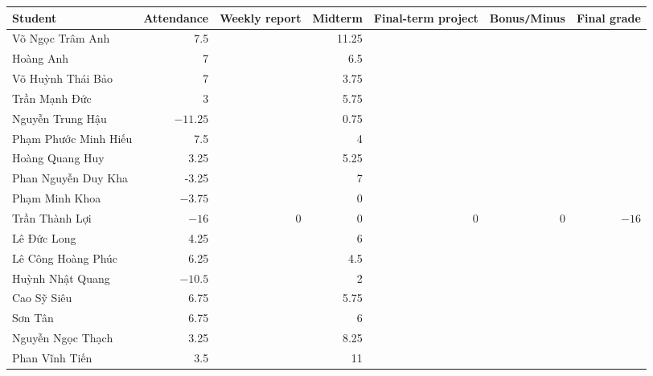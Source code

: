\documentclass{article}
\begin{document}
\begin{table}[H]
    \centering
    \begin{tabular}{|l|r|r|r|r|r|r|}
        \hline
        Student & Attendance & Weekly report & Midterm & Final-term project & Bonus{\tt/}Minus & Final grade \\
        \hline
        {\sc Võ Ngọc Trâm Anh} & 7.5 &  & 11.25 &  &  &  \\
        \hline
        {\sc Hoàng Anh} & 7 &  & 6.5 &  &  &  \\
        \hline
        {\sc Võ Huỳnh Thái Bảo} & 7 &  & 3.75 &  &  &  \\
        \hline
        {\sc Trần Mạnh Đức} & 3 &  & 5.75 &  &  &  \\
        \hline
        {\sc Nguyễn Trung Hậu} & $-11.25$ &  & 0.75 &  &  &  \\
        \hline
        {\sc Phạm Phước Minh Hiếu} & 7.5 &  & 4 &  &  &  \\
        \hline
        {\sc Hoàng Quang Huy} & 3.25 &  & 5.25 &  &  &  \\
        \hline
        {\sc Phan Nguyễn Duy Kha} & -3.25 &  & 7 &  &  &  \\
        \hline
        {\sc Phạm Minh Khoa} & $-3.75$ &  & 0 &  &  &  \\
        \hline
        {\sc Trần Thành Lợi} & $-16$ & 0 & 0 & 0 & 0 & $-16$ \\
        \hline
        {\sc Lê Đức Long} & 4.25 &  & 6 &  &  &  \\
        \hline
        {\sc Lê Công Hoàng Phúc} & 6.25 & & 4.5 &  &  &  \\
        \hline
        {\sc Huỳnh Nhật Quang} & $-10.5$ &  & 2 &  &  &  \\
        \hline
        {\sc Cao Sỹ Siêu} & 6.75 &  & 5.75 &  &  &  \\
        \hline
        {\sc Sơn Tân} & 6.75 &  & 6 &  &  &  \\
        \hline
        {\sc Nguyễn Ngọc Thạch} & 3.25 &  & 8.25 &  &  &  \\
        \hline
        {\sc Phan Vĩnh Tiến} & 3.5 &  & 11 &  &  &  \\
        \hline
    \end{tabular}
\end{table}

\end{document}
